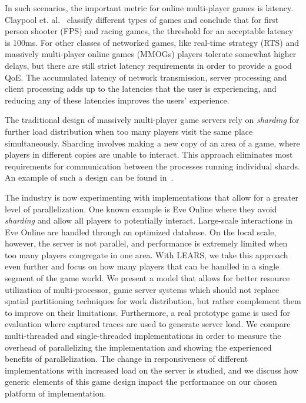 In such scenarios, the important metric for online multi-player games
is latency. Claypool et. al.~\cite{claypool++-2006} classify different
types of games and conclude that for first person shooter (FPS) and
racing games, the threshold for an acceptable latency is 100ms. For
other classes of networked games, like real-time strategy (RTS) and
massively multi-player online games (MMOGs) players tolerate
somewhat higher delays, but there are still strict latency
requirements in order to provide a good QoE. The accumulated latency
of network transmission, server processing and client processing adds
up to the latencies that the user is experiencing, and reducing any of
these latencies improves the users' experience.

The traditional design of massively multi-player game servers rely on
\textit{sharding} for further load distribution when too many players
visit the same place simultaneously. Sharding involves making
a new copy of an area of a game, where players in different copies are
unable to interact. This approach eliminates most requirements for
communication between the processes running individual shards. An
example of such a design can be found in~\cite{chu-2008}.

The industry is now experimenting with implementations that allow for
a greater level of parallelization. One known example is Eve Online
\cite{drain-2008} where they avoid \textit{sharding} and allow all
players to potentially interact. Large-scale interactions in Eve
Online are handled through an optimized database. On the local scale,
however, the server is not parallel, and performance is extremely
limited when too many players congregate in one area. With LEARS, we
take this approach even further and focus on how many players that can
be handled in a single segment of the game world. We present a model
that allows for better resource utilization of multi-processor, game
server systems which should not replace spatial partitioning
techniques for work distribution, but rather complement them to
improve on their limitations. Furthermore, a real prototype game is
used for evaluation where captured traces are used to generate server
load. We compare multi-threaded and single-threaded implementations in
order to measure the overhead of parallelizing the implementation and
showing the experienced benefits of parallelization. The change in
responsiveness of different implementations with increased load on the
server is studied, and we discuss how generic elements of this game
design impact the performance on our chosen platform of
implementation.

